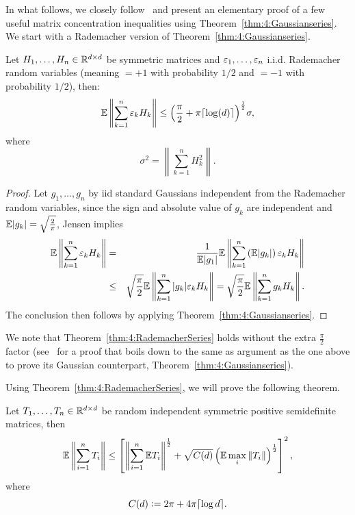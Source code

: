 In what follows, we closely follow~\cite{Tropp_MatrixConcentrationElementary} and present an elementary proof of a few useful matrix concentration inequalities using Theorem~\ref{thm:4:Gaussianseries}. We start with a Rademacher version of Theorem~\ref{thm:4:Gaussianseries}.

\begin{theorem}\label{thm:4:RademacherSeries}
 Let $H_1,\dots,H_n\in \mathbb{R}^{d\times d}$ be symmetric matrices and $\varepsilon_1,\dots,\varepsilon_n$ i.i.d. Rademacher random variables (meaning $=+1$ with probability $1/2$ and $=-1$ with probability $1/2$), then: 
\[
\mathbb{E} \left\| \sum_{k=1}^{n} \varepsilon_k H_k \right\| \leq \Big(  \frac\pi2 + \pi\lceil\log(d)\rceil \Big)^{\frac12} \sigma,
\]
where
\begin{equation}\label{eq:4:sigma:forrademacherseries}
\sigma^2 = \left\| \sum_{k=1}^n H_k^2  \right\|.
\end{equation}
\end{theorem}

\begin{proof}
Let $g_1,\dots,g_n$ by iid standard Gaussians independent from the Rademacher random variables, since the sign and absolute value of $g_k$ are independent and $\mathbb{E}|g_k| = \sqrt{\frac2\pi}$, Jensen implies
\begin{eqnarray*}
\mathbb{E} \left\| \sum_{k=1}^{n} \varepsilon_k H_k \right\| & = &\frac{1}{\mathbb{E}|g_1|} \mathbb{E} \left\| \sum_{k=1}^{n} \left(\mathbb{E}|g_k|\right)\varepsilon_k H_k \right\| \\ & \leq & \sqrt{\frac{\pi}2} \mathbb{E} \left\| \sum_{k=1}^{n} |g_k|\varepsilon_k H_k \right\| = \sqrt{\frac{\pi}2} \mathbb{E} \left\| \sum_{k=1}^{n} g_k H_k \right\|. 
\end{eqnarray*}
The conclusion then follows by applying Theorem~\ref{thm:4:Gaussianseries}.
\end{proof}

We note that Theorem~\ref{thm:4:RademacherSeries} holds without the extra $\frac{\pi}{2}$ factor (see~\cite{Tropp_MatrixConcentrationElementary} for a proof that boils down to the same as argument as the one above to prove its Gaussian counterpart, Theorem~\ref{thm:4:Gaussianseries}).

Using Theorem~\ref{thm:4:RademacherSeries}, we will prove the following theorem.

\begin{theorem}\label{thm:4:matrixconcentration:PSDcase}
Let $T_1,\dots,T_n\in\mathbb{R}^{d\times d}$ be random independent symmetric positive semidefinite matrices, then
\[
\mathbb{E} \left\| \sum_{i=1}^n T_i  \right\| \leq \left[  \left\| \sum_{i=1}^n \mathbb{E} T_i \right\|^{\frac12}  + \sqrt{C(d)} \left(   \mathbb{E} \max_i \| T_i\|   \right)^{\frac12}    \right]^2,
\]
where
\begin{equation}\label{eq:4:Cd_constant}
C(d) \mathrel{\mathop:}= 2\pi + 4\pi\lceil \log d \rceil.
\end{equation}
\end{theorem}


